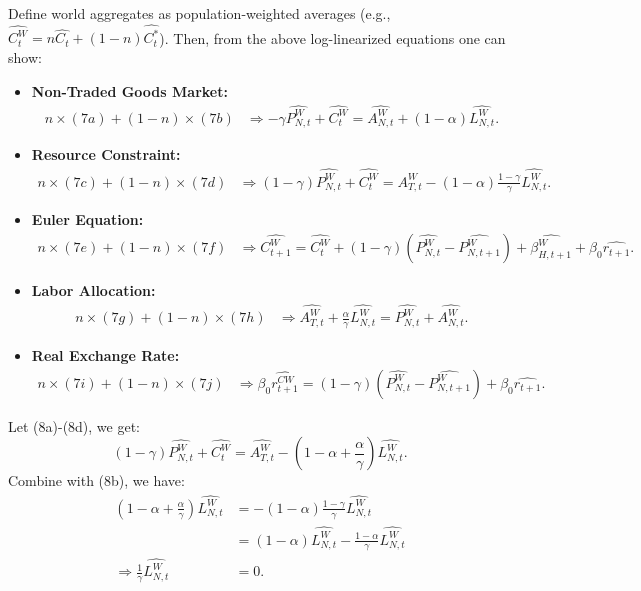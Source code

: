 \documentclass[a4paper,12pt]{article} %
\theoremstyle{nonitalic}
\begin{document}
Define world aggregates as population-weighted averages (e.g., $  \widehat{C_t^W} = n \widehat{C_t} + (1-n) \widehat{C_t^*}$).
Then, from the above log-linearized equations one can show:
\begin{itemize}
    \item \textbf{Non-Traded Goods Market:}
    \begin{align*}
        n \times (7a) + (1-n) \times (7b) &\Rightarrow -\gamma  \widehat{P_{N,t}^W} +  \widehat{C_t^W} =  \widehat{A_{N,t}^W} + (1-\alpha)  \widehat{L_{N,t}^W} \tag{8a}.
    \end{align*}
    \item \textbf{Resource Constraint:}
    \begin{align*}
        n \times (7c) + (1-n) \times (7d) &\Rightarrow (1-\gamma)  \widehat{P_{N,t}^W} +  \widehat{C_t^W} =  \widehat{A_{T,t}^W} - (1-\alpha) \frac{1-\gamma}{\gamma}  \widehat{L_{N,t}^W} \tag{8b}.
    \end{align*}
    \item \textbf{Euler Equation:}
    \begin{align*}
        n \times (7e) + (1-n) \times (7f) &\Rightarrow  \widehat{C_{t+1}^W} =  \widehat{C_t^W} + (1-\gamma) ( \widehat{P_{N,t}^W} -  \widehat{P_{N,t+1}^W}) +  \widehat{\beta_{H,t+1}^W} + \beta_0 \widehat{r_{t+1}} \tag{8c}.
    \end{align*}
    \item \textbf{Labor Allocation:}
    \begin{align*}
        n \times (7g) + (1-n) \times (7h) &\Rightarrow  \widehat{A_{T,t}^W} + \frac{\alpha}{\gamma}  \widehat{L_{N,t}^W} =  \widehat{P_{N,t}^W} +  \widehat{A_{N,t}^W} \tag{8d}.
    \end{align*}
    \item \textbf{Real Exchange Rate:}
    \begin{align*}
        n \times (7i) + (1-n) \times (7j) &\Rightarrow \beta_0  \widehat{r_{t+1}^{C W}} = (1-\gamma) ( \widehat{P_{N,t}^W} -  \widehat{P_{N,t+1}^W}) + \beta_0  \widehat{r_{t+1}} \tag{8e}.
    \end{align*}
\end{itemize}
Let (8a)-(8d), we get:
\[
(1-\gamma)  \widehat{P_{N,t}^W} +  \widehat{C_t^W} =  \widehat{A_{T,t}^W} - (1-\alpha + \frac{\alpha}{\gamma})  \widehat{L_{N,t}^W}.
\]
Combine with (8b), we have:
\begin{align*}
    (1 - \alpha + \frac{\alpha}{\gamma})  \widehat{L_{N,t}^W} &= -(1-\alpha) \frac{1-\gamma}{\gamma}  \widehat{L_{N,t}^W} \\
    &= (1-\alpha)  \widehat{L_{N,t}^W} - \frac{1-\alpha}{\gamma}  \widehat{L_{N,t}^W} \\
    \Rightarrow \frac{1}{\gamma}  \widehat{L_{N,t}^W} &= 0.
\end{align*}
\end{document}
